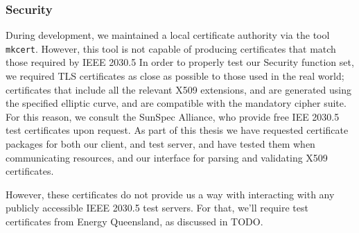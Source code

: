 \subsubsection{Security}
During development, we maintained a local certificate authority via the tool \texttt{mkcert}. However, this tool is not capable of producing certificates that match those required by IEEE 2030.5
In order to properly test our Security function set, we required TLS certificates as close as possible to those used in the real world; certificates that include all the relevant X509 extensions, and are generated using the specified elliptic curve, and are compatible with the mandatory cipher suite. For this reason, we consult the SunSpec Alliance, who provide free IEE 2030.5 test certificates upon request. As part of this thesis we have requested certificate packages for both our client, and test server, and have tested them when communicating resources, and our interface for parsing and validating X509 certificates.

However, these certificates do not provide us a way with interacting with any publicly accessible IEEE 2030.5 test servers. For that, we'll require test certificates from Energy Queensland, as discussed in TODO.









